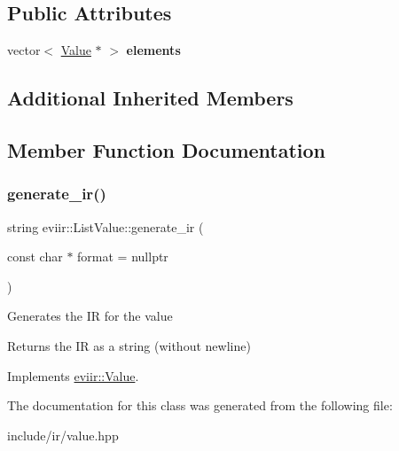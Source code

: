 \subsection*{Public Attributes}
\begin{DoxyCompactItemize}
\item 
\mbox{\label{classeviir_1_1ListValue_a5bc8c31cf9ca0b62bc02edd6215c7612}} 
vector$<$ \hyperlink{classeviir_1_1Value}{Value} $\ast$ $>$ {\bfseries elements}
\end{DoxyCompactItemize}
\subsection*{Additional Inherited Members}


\subsection{Member Function Documentation}
\mbox{\label{classeviir_1_1ListValue_ad12dee3774ad443ad0e27354909e8dc9}} 
\subsubsection{\texorpdfstring{generate\+\_\+ir()}{generate\_ir()}}
{\footnotesize\ttfamily string eviir\+::\+List\+Value\+::generate\+\_\+ir (\begin{DoxyParamCaption}\item[{const char $\ast$}]{format = {\ttfamily nullptr} }\end{DoxyParamCaption})\hspace{0.3cm}{\ttfamily [virtual]}}

Generates the IR for the value \begin{DoxyReturn}{Returns}
the IR as a string (without newline) 
\end{DoxyReturn}


Implements \hyperlink{classeviir_1_1Value_a0613bf660425df31e230681555f64dea}{eviir\+::\+Value}.



The documentation for this class was generated from the following file\+:\begin{DoxyCompactItemize}
\item 
include/ir/value.\+hpp\end{DoxyCompactItemize}
